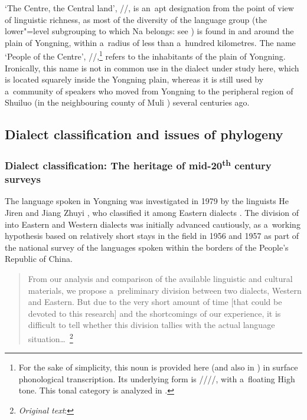 ‘The Centre, the Central land’, //, is an~apt designation from the point of view of linguistic richness, as most of the diversity of the  language group (the lower"=level subgrouping to which Na belongs: see ) is found in and around the plain of Yongning, within a~radius of less than a~hundred kilometres. The name ‘People of the Centre’, //,\footnote{For the sake of simplicity, this noun is provided here (and also in ) in surface phonological transcription. Its underlying form is ////, with a~{floating} High tone. This tonal category is analyzed in .} refers to the
inhabitants of the plain of Yongning. Ironically, this name is not in common use in the dialect under study here, which is located squarely inside the Yongning plain, whereas it is still used by a~community of speakers who moved from Yongning to the peripheral region of Shuiluo  (in the neighbouring county of Muli ) several centuries ago.


\subsection{Dialect classification and issues of phylogeny}
\label{sec:dialectclassificationyongningnaandnaxi}

\subsubsection{Dialect classification: The heritage of mid-20\textsuperscript{th} century surveys}
\label{sec:dialectclassification}

The language spoken in Yongning was investigated in 1979 by the linguists He 
Jiren  and Jiang Zhuyi , who classified it among Eastern  dialects \citep[4, 104--116]{heetal1985}. The division of  into Eastern and Western dialects was initially advanced cautiously, as a~working hypothesis based on relatively short stays in the field in 1956 and 1957 as part of the national survey of the languages spoken within the borders of the People’s Republic of China.

\begin{quotation}
	From our analysis and comparison of the available linguistic and cultural materials, we propose a~preliminary division between two dialects, Western and Eastern. But due to the very short amount
	of time [that could be devoted to this research] and the shortcomings of our experience, it is
	difficult to tell whether this division tallies with the actual language
	situation{\dots}~\citep[120]{heetal1988}\footnote{\textit{Original text}: }
\end{quotation}

